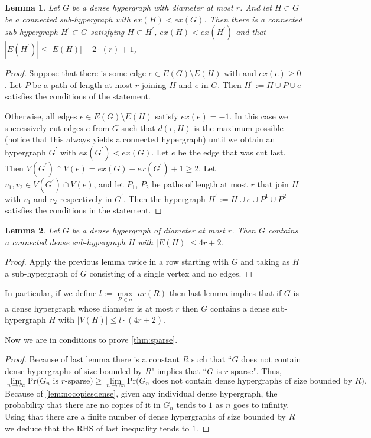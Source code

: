 \documentclass[12pt,notitlepage,a4paper]{article}
\newtheorem{lemma}{Lemma}[section]
\theoremstyle{definition}
\newcommand{\Ln}{\lim\limits_{n\to \infty}}
\begin{document}
\begin{lemma}
	Let $G$ be a
	dense hypergraph with diameter at most $r$.
	And let $H\subset G$ be a connected 
	sub-hypergraph with $ex(H)<ex(G)$. Then
	there is a connected
	sub-hypergraph $H^\prime \subset G$
	satisfying $H\subset H^\prime$,
	$ex(H)<ex(H^\prime)$ and that 
	$|E(H^\prime)|\leq |E(H)|+2\cdot(r) + 1$, 
\end{lemma}
\begin{proof}
	Suppose that there is some edge $e\in E(G)\setminus E(H)$ with
	and $ex(e)\geq 0$. Let $P$ be a path
	of length at most $r$ joining $H$ and $e$ in $G$. 
	Then $H^\prime:=H\cup P \cup e$ satisfies the conditions of 
	the statement. \par
	Otherwise, all edges $e\in E(G)\setminus E(H)$ 
	satisfy $ex(e)=-1$. In this case we successively cut
	edges $e$ from $G$ such that $d(e, H)$ is the maximum possible
	(notice that this always yields a connected hypergraph)
	until we obtain an hypergraph $G^\prime$ with $ex(G^\prime)<ex(G)$.
	Let $e$ be the edge that was cut last. Then $V(G^\prime)\cap V(e)=
	ex(G)-ex(G^\prime)+1 \geq 2$. Let $v_1, v_2\in V(G^\prime)\cap V(e)$,
	and let $P_1$, $P_2$ be paths of length at most $r$ that join $H$
	with $v_1$ and $v_2$ respectively in $G^\prime$. Then the hypergraph
	$H^\prime:=H\cup e \cup P^1 \cup P^2$ satisfies the conditions 
	in the statement. 
\end{proof}

\begin{lemma}
	Let $G$ be a
	dense hypergraph of diameter at most 
	$r$. Then $G$ contains a connected 
	dense sub-hypergraph $H$ 
	with $|E(H)|\leq 4r+2$. 
\end{lemma}
\begin{proof}
	Apply the previous lemma twice in a row starting with $G$ and taking
	as $H$ a sub-hypergraph of $G$ consisting of a single vertex and 
	no edges. 
\end{proof}

In particular, if we define $l:=\max\limits_{R\in \sigma} \,\, ar(R)$
then last lemma implies that if $G$ is a dense hypergraph whose
diameter is at most $r$ then $G$ contains a dense sub-hypergraph
$H$ with $|V(H)|\leq l\cdot (4r+2)$.\par

Now we are in conditions to prove \cref{thm:sparse}.

\begin{proof}
	Because of last lemma there is a constant $R$ such that 
	``$G$ does not contain dense hypergraphs of size bounded by $R$" implies
	that ``$G$ is $r$-sparse". Thus,
	\[ \Ln \mathrm{Pr}\big( G_n \text{ is } r \text{-sparse}  \big)
	\geq \Ln \mathrm{Pr} \big( G_n \text{ does not contain dense 
	hypergraphs of size bounded by } R\big).\] 
	Because of	\cref{lem:nocopiesdense}, given any individual dense hypergraph,
	the probability that there are no copies
	of it in $G_n$ tends to $1$ as $n$ goes to infinity. Using that
	there are a finite number of dense hypergraphs of size bounded by
	$R$ we deduce that the RHS of last inequality tends to $1$. 
\end{proof}
\end{document}

